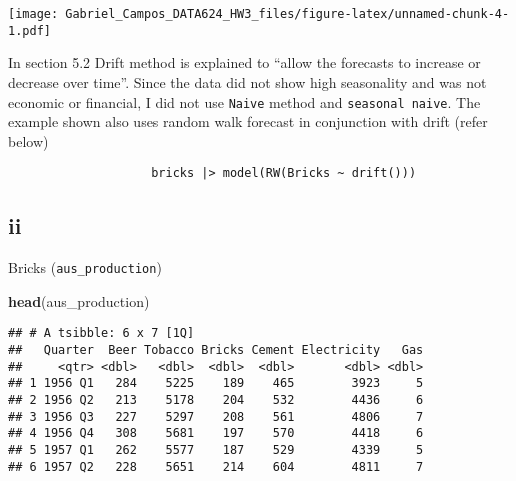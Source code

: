 \documentclass[
]{article}
\newenvironment{Shaded}{\begin{snugshade}}{\end{snugshade}}
\newcommand{\FunctionTok}[1]{\textcolor[rgb]{0.13,0.29,0.53}{\textbf{#1}}}
\newcommand{\NormalTok}[1]{#1}
\begin{document}
\texttt{[image: Gabriel\_Campos\_DATA624\_HW3\_files/figure-latex/unnamed-chunk-4-1.pdf]}

In section 5.2 Drift method is explained to ``allow the forecasts to
increase or decrease over time''. Since the data did not show high
seasonality and was not economic or financial, I did not use
\texttt{Naive} method and \texttt{seasonal\ naive}. The example shown
also uses random walk forecast in conjunction with drift (refer below)

\begin{verbatim}
                    bricks |> model(RW(Bricks ~ drift()))
\end{verbatim}

\hypertarget{ii}{%
\subsection{ii}\label{ii}}

Bricks (\texttt{aus\_production})

\begin{Shaded}
\begin{Highlighting}[]
\FunctionTok{head}\NormalTok{(aus\_production)}
\end{Highlighting}
\end{Shaded}

\begin{verbatim}
## # A tsibble: 6 x 7 [1Q]
##   Quarter  Beer Tobacco Bricks Cement Electricity   Gas
##     <qtr> <dbl>   <dbl>  <dbl>  <dbl>       <dbl> <dbl>
## 1 1956 Q1   284    5225    189    465        3923     5
## 2 1956 Q2   213    5178    204    532        4436     6
## 3 1956 Q3   227    5297    208    561        4806     7
## 4 1956 Q4   308    5681    197    570        4418     6
## 5 1957 Q1   262    5577    187    529        4339     5
## 6 1957 Q2   228    5651    214    604        4811     7
\end{verbatim}
\end{document}
